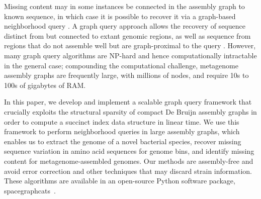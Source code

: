 Missing content may in some instances be connected in the assembly
graph to known sequence, in which case it is possible to recover it
via a graph-based neighborhood query \cite{metacherchant,perchlorate}.  A graph query approach allows the recovery of sequence distinct from but connected to extant
genomic regions, as well as sequence from regions that do not assemble
well but are graph-proximal to the query \cite{metacherchant}.  However, many graph query
algorithms are NP-hard and hence computationally intractable in the
general case; compounding the computational challenge, metagenome assembly
graphs are frequently large, with millions of nodes, and require 10s
to 100s of gigabytes of RAM.

In this paper, we develop and implement a scalable graph query
framework that crucially exploits the structural sparsity of compact De Bruijn
assembly graphs in order to compute a succinct index data structure in linear
time. We use this framework to perform neighborhood
queries in large assembly graphs, which enables us to extract the
genome of a novel bacterial species, recover missing sequence
variation in amino acid sequences for genome bins, and identify
missing content for metagenome-assembled genomes.  Our methods
are assembly-free and avoid error correction and other techniques that
may discard strain information.  These algorithms are available in an
open-source Python software package,
\textsf{spacegraphcats}~\cite{spacegraphcats}.

